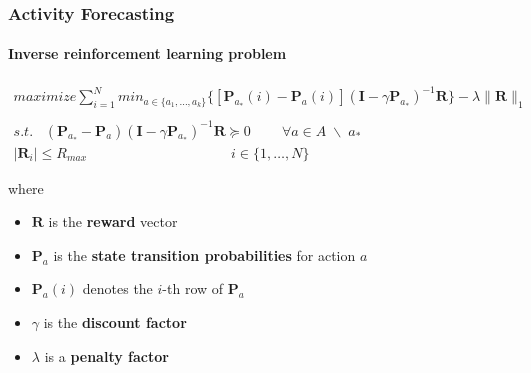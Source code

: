 \begin{frame}
	\frametitle{Activity Forecasting}
	\framesubtitle{Inverse reinforcement learning problem}
	
	\large
	
	\begin{eqnarray*}
		maximize \sum_{i=1}^N min_{a \in \{a_1, \ldots, a_k \}} \Big \{ [ \mathbf{P}_{a_*}(i) - \mathbf{P}_a(i) ] ( \mathbf{I} - \gamma \mathbf{P}_{a_*})^{-1} \mathbf{R} \Big \} - \lambda \| \mathbf{R} \|_1 \\ \\
		s.t. \;\;\; (\mathbf{P}_{a_*} - \mathbf{P}_a)(\mathbf{I} - \gamma \mathbf{P}_{a_*})^{-1} \mathbf{R} \succeq 0 \;\;\;\;\;\;\;\; \forall a \in A \; \backslash \; a_* \;\;\;\;\;\;\;\;\;\;\;\;\;\;\;\;\;\;\;\; \\
		| \mathbf{R}_i | \leq R_{max} \;\;\;\;\;\;\;\;\;\;\;\;\;\;\;\;\;\;\;\;\;\;\;\;\;\;\;\;\;\;\;\;\;\;\;\;\; i \in \{ 1, \ldots, N \} \;\;\;\;\;\;\;\;\;\;\;\;\,\,
	\end{eqnarray*}
	
	\vspace{0.2cm}
	
	where
	
	\begin{itemize}
		\item $ \mathbf{R} $ is the \textbf{reward} vector
		\item $ \mathbf{P}_a $ is the \textbf{state transition probabilities} for action
			  $ a $
		\item $ \mathbf{P}_a(i) $ denotes the $ i $-th row of $ \mathbf{P}_a $
		\item $ \gamma $ is the \textbf{discount factor}
		\item $ \lambda $ is a \textbf{penalty factor}
	\end{itemize}
\end{frame}
